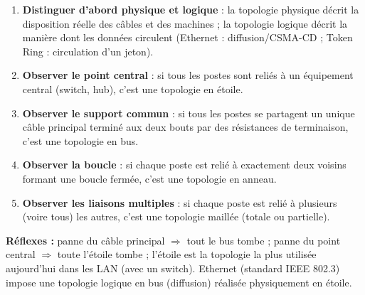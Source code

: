 \documentclass[11pt]{article}
\newcommand{\cle}[1]{{\popxbold\color{popdark}#1}}
\begin{document}
\begin{methode}
\begin{enumerate}
\item \textbf{Distinguer d'abord physique et logique} : la topologie \cle{physique} décrit la disposition réelle des câbles et des machines ; la topologie \cle{logique} décrit la manière dont les données circulent (Ethernet : diffusion/CSMA-CD ; Token Ring : circulation d'un jeton).
\item \textbf{Observer le point central} : si tous les postes sont reliés à un équipement central (switch, hub), c'est une topologie en \cle{étoile}.
\item \textbf{Observer le support commun} : si tous les postes se partagent un unique câble principal terminé aux deux bouts par des résistances de terminaison, c'est une topologie en \cle{bus}.
\item \textbf{Observer la boucle} : si chaque poste est relié à exactement deux voisins formant une boucle fermée, c'est une topologie en \cle{anneau}.
\item \textbf{Observer les liaisons multiples} : si chaque poste est relié à plusieurs (voire tous) les autres, c'est une topologie \cle{maillée} (totale ou partielle).
\end{enumerate}
\textbf{Réflexes :} panne du câble principal $\Rightarrow$ tout le bus tombe ; panne du point central $\Rightarrow$ toute l'étoile tombe ; l'étoile est la topologie la plus utilisée aujourd'hui dans les LAN (avec un switch). Ethernet (standard IEEE 802.3) impose une topologie logique en bus (diffusion) réalisée physiquement en étoile.
\end{methode}
\end{document}
